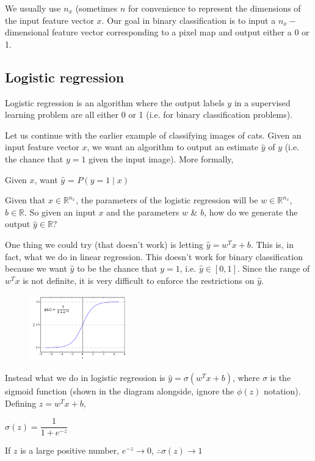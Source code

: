 \documentclass{article}[a4paper,12pt]
\theoremstyle{definition}
\begin{document}
We usually use $n_x$ (sometimes $n$ for convenience to represent the dimensions of the input feature vector $x$. Our goal in binary classification is to input a $n_x-$dimensional feature vector corresponding to a pixel map and output either a 0 or 1. 
\subsection{Logistic regression}
Logistic regression is an algorithm where the output labels $y$ in a supervised learning problem are all either 0 or 1 (i.e. for binary classification problems).
\vspace{6pt}

Let us continue with the earlier example of classifying images of cats. Given an input feature vector $x$, we want an algorithm to output an estimate $\hat{y}$ of $y$ (i.e. the chance that $y=1$ given the input image). More formally, 
\begin{center}
Given $x$, want $\hat{y}$ = $P(y=1\mid x)$
\end{center}
Given that $x\in\mathbb{R}^{n_x}$, the parameters of the logistic regression will be $w\in\mathbb{R}^{n_x}$, $b\in\mathbb{R}$. So given an input $x$ and the parameters $w$ \& $b$, how do we generate the output $\hat{y}\in\mathbb{R}$? 
\vspace{6pt}

One thing we could try (that doesn't work) is letting $\hat{y}=w^Tx+b$. This is, in fact, what we do in linear regression. This doesn't work for binary classification because we want $\hat{y}$ to be the chance that $y=1$, i.e. $\hat{y}\in\left[0,1\right]$. Since the range of $w^Tx$ is not definite, it is very difficult to enforce the restrictions on $\hat{y}$.

\begin{figure}
\centering \includegraphics[width=0.38\textwidth]{sigmoid_logistic_regression.png}
\end{figure}
\vspace{6pt}

Instead what we do in logistic regression is $\hat{y}=\sigma(w^Tx+b)$, where $\sigma$ is the sigmoid function (shown in the diagram alongside, ignore the $\phi(z)$ notation). Defining $z=w^Tx+b$,
\begin{center}
$\boxed{\sigma(z)=\dfrac{1}{1+e^{-z}}}$
\end{center}
If $z$ is a large positive number, $e^{-z}\rightarrow 0$, $\therefore\sigma(z)\rightarrow 1$
\end{document}
